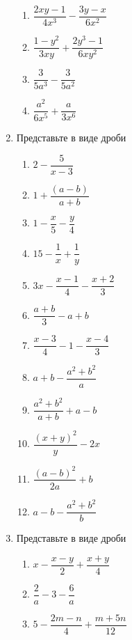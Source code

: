 \documentclass[10pt, a4paper]{article}
\begin{document}
\begin{enumerate}
\begin{multicols}{4}
		\begin{enumerate}
			\item $\dfrac{2xy-1}{4x^3}-\dfrac{3y-x}{6x^2}$ 
			\item $\dfrac{1-y^2}{3xy}+\dfrac{2y^3-1}{6xy^2}$ 
			\item $\dfrac{3}{5a^3}-\dfrac{3}{5a^2}$ 
			\item $\dfrac{a^2}{6x^5}+\dfrac{a}{3x^6}$ 
		\end{enumerate}
	\end{multicols}
	\item Представьте в виде дроби
	\begin{multicols}{3}
		\begin{enumerate}
			\item $2-\dfrac{5}{x-3}$ 
			\item $1+\dfrac{(a-b)}{a+b}$ 
			\item $1-\dfrac{x}{5}-\dfrac{y}{4}$ 
			\item $15-\dfrac{1}{x}+\dfrac{1}{y}$ 
			\item $3x-\dfrac{x-1}{4}-\dfrac{x+2}{3}$ 
			\item $\dfrac{a+b}{3}-a+b$ 
			\item $\dfrac{x-3}{4}-1-\dfrac{x-4}{3}$ 
			\item $a+b-\dfrac{a^2+b^2}{a}$ 
			\item $\dfrac{a^2+b^2}{a+b}+a-b$ 
			\item $\dfrac{(x+y)^2}{y}-2x$ 
			\item $\dfrac{(a-b)^2}{2a}+b$ 
			\item $a-b-\dfrac{a^2+b^2}{b}$ 
		\end{enumerate}
	\end{multicols}
	\item Представьте в виде дроби
	\begin{multicols}{2}
		\begin{enumerate}
			\item $x-\dfrac{x-y}{2}+\dfrac{x+y}{4}$ 
			\item $\dfrac{2}{a}-3-\dfrac{6}{a}$ 
			\item $5-\dfrac{2m-n}{4}+\dfrac{m+5n}{12}$ 

\end{enumerate}
\end{multicols}
\end{enumerate}
\end{document}
